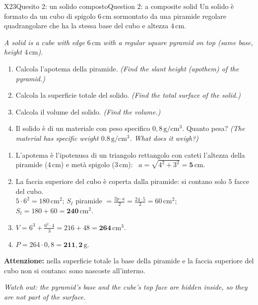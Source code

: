 \documentclass[11pt,a4paper]{article}
\newcommand{\en}[1]{\par{\small\itshape\color{engray}#1\par}}
\newcommand{\enx}[1]{{\small\itshape\color{engray}(#1)}}
\newcommand{\unit}[1]{\,\mathrm{#1}}
\newcommand{\cm}{\unit{cm}}
\newcommand{\cmq}{\unit{cm^2}}
\newcommand{\cmc}{\unit{cm^3}}
\newcommand{\errore}[2]{\begin{attenzione}\textbf{\color{fgA}Attenzione:} #1\par
  {\itshape\color{engray}Watch out: #2}\end{attenzione}}
\begin{document}
\begin{esercizio}{X2}{3}{Quesito 2: un solido composto}{Question 2: a composite solid}
Un solido è formato da un cubo di spigolo $6\cm$ sormontato da una piramide regolare quadrangolare che ha la stessa base del cubo e altezza $4\cm$.
\en{A solid is a cube with edge $6\cm$ with a regular square pyramid on top (same base, height $4\cm$).}
\begin{enumerate}
\item Calcola l'apotema della piramide. \enx{Find the slant height (apothem) of the pyramid.}
\item Calcola la superficie totale del solido. \enx{Find the total surface of the solid.}
\item Calcola il volume del solido. \enx{Find the volume.}
\item Il solido è di un materiale con peso specifico $0,8\unit{g/cm^3}$. Quanto pesa? \enx{The material has specific weight $0.8\unit{g/cm^3}$. What does it weigh?}
\end{enumerate}
\begin{center}
\end{center}
\end{esercizio}
\begin{solbox}
\begin{enumerate}
\item L'apotema è l'ipotenusa di un triangolo rettangolo con cateti l'altezza della piramide ($4\cm$) e metà spigolo ($3\cm$): \ $a=\sqrt{4^2+3^2}=\mathbf{5\cm}$.
\item La faccia superiore del cubo è coperta dalla piramide: si contano solo $5$ facce del cubo.\\
$5\cdot6^2=180\cmq$; \quad $S_\ell$ piramide $=\frac{2p\cdot a}{2}=\frac{24\cdot5}{2}=60\cmq$; \quad $S_t=180+60=\mathbf{240\cmq}$.
\item $V=6^3+\frac{6^2\cdot4}{3}=216+48=\mathbf{264\cmc}$.
\item $P=264\cdot0,8=\mathbf{211,2\unit{g}}$.
\end{enumerate}
\errore{nella superficie totale la base della piramide e la faccia superiore del cubo non si contano: sono nascoste all'interno.}
{the pyramid's base and the cube's top face are hidden inside, so they are not part of the surface.}
\end{solbox}
\end{document}
